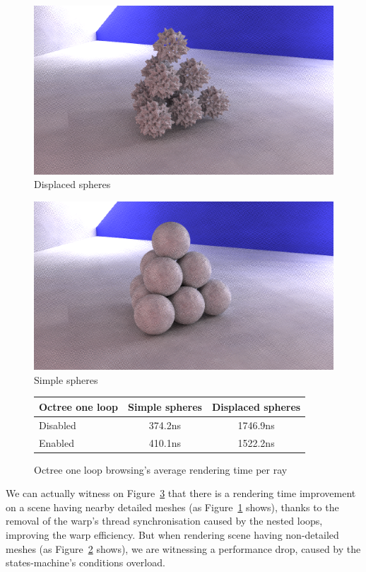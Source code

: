 \documentclass[10pt,twocolumn,a4paper]{article}
\begin{document}
\begin{figure}[h]
    \centering
    \includegraphics[width=0.8\columnwidth]{render_displaced_spheres.png}
    \caption{Displaced spheres}
    \label{fig:displaced_spheres}
\end{figure}

\begin{figure}[h]
    \centering
    \includegraphics[width=0.8\columnwidth]{render_spheres.png}
    \caption{Simple spheres}
    \label{fig:spheres}
\end{figure}

\begin{figure}[H]
    \tiny
    \centering
    \begin{tabular}{ | l | c | c | }

        \hline
        Octree one loop & Simple spheres & Displaced spheres \\
        \hline
        Disabled & 374.2ns & 1746.9ns \\
        Enabled & 410.1ns & 1522.2ns \\
        \hline

    \end{tabular}
    \caption{Octree one loop browsing's average rendering time per ray}
    \label{table:octree_one_loop_browsing}
\end{figure}

We can actually witness on Figure~\ref{table:octree_one_loop_browsing} that
there is a rendering time improvement on a scene having nearby detailed meshes
(as Figure~\ref{fig:displaced_spheres} shows), thanks to the removal of the warp's thread
synchronisation caused by the nested loops, improving the warp efficiency. But
when rendering scene having non-detailed meshes (as Figure~\ref{fig:spheres} shows), we
are witnessing a performance drop, caused by the states-machine's conditions
overload.
\end{document}
